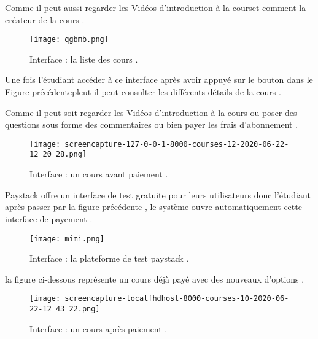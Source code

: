 \medskip

Comme  il peut aussi regarder les Vidéos d'introduction à la courset comment la créateur de la cours .
\bigskip
\bigskip
\bigskip
\begin{figure}[ht]
	\centering
	\texttt{[image: qgbmb.png]}
	\caption{Interface : la liste des cours .}
	\label{fig:Interface : la liste des cours }
\end{figure}
\FloatBarrier
\bigskip
\bigskip
\bigskip
Une fois l'étudiant accéder  à ce interface  après avoir appuyé sur le bouton dans le Figure précédentepleut il peut consulter les différents détails de la cours .

\medskip

 Comme il peut soit regarder les Vidéos d'introduction à la cours ou poser des questions sous forme des commentaires  ou bien payer les frais d'abonnement .
\begin{figure}[ht]
	\centering
	\texttt{[image: screencapture-127-0-0-1-8000-courses-12-2020-06-22-12\_20\_28.png]}
	\caption{Interface : un cours avant paiement .}
	\label{fig:Interface :un cours avant paiement }
\end{figure}
\FloatBarrier
Paystack offre un interface de test gratuite pour leurs utilisateurs
donc l'étudiant après passer par la figure précédente , le système ouvre automatiquement cette interface de payement .
\begin{figure}[ht]
	\centering
	\texttt{[image: mimi.png]}
	\caption{Interface : la plateforme de test  paystack .}
	\label{fig:Interface : la plateforme de test  paystack }
\end{figure}
\FloatBarrier
la figure ci-dessous représente un cours déjà payé avec des nouveaux d'options .
\begin{figure}[ht]
	\centering
	\texttt{[image: screencapture-localfhdhost-8000-courses-10-2020-06-22-12\_43\_22.png]}
	\caption{Interface : un cours après paiement .}
	\label{fig:Interface :un cours après paiement }
\end{figure}
\FloatBarrier






